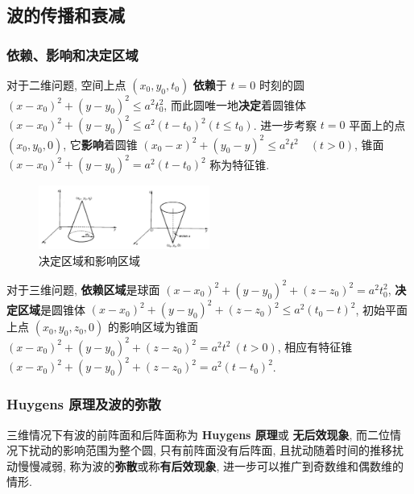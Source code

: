 \documentclass[10pt]{yerbaformat}
\begin{document}
\subsection{波的传播和衰减}

\subsubsection{依赖、影响和决定区域}
\par 对于二维问题, 空间上点 $\left(x_{0}, y_{0}, t_{0}\right)$ \textbf{依赖}于 $t=0$ 时刻的圆 $\left(x-x_{0}\right)^{2}+\left(y-y_{0}\right)^{2} \leqslant a^{2} t_{0}^{2}$, 而此圆唯一地\textbf{决定}着圆锥体 $\left(x-x_{0}\right)^{2}+\left(y-y_{0}\right)^{2} \leqslant a^{2}\left(t-t_{0}\right)^{2} \left(t \leqslant t_{0}\right)$. 进一步考察 $t=0$ 平面上的点 $\left(x_{0}, y_{0}, 0\right)$, 它\textbf{影响}着圆锥 $\left(x_{0}-x\right)^{2}+\left(y_{0}-y\right)^{2} \leqslant a^{2} t^{2} \quad(t>0)$, 锥面 $\left(x-x_{0}\right)^{2}+\left(y-y_{0}\right)^{2}=a^{2}\left(t-t_{0}\right)^{2}$ 称为特征锥.

\begin{figure}[htbp]
    \centering
    \includegraphics[width=0.5\textwidth]{figure/domain.jpg}
    \caption{决定区域和影响区域 \label{fig:scatter}}
\end{figure}

\par 对于三维问题, \textbf{依赖区域}是球面 $\left(x-x_{0}\right)^{2}+\left(y-y_{0}\right)^{2}+\left(z-z_{0}\right)^{2}=a^{2} t_{0}^{2}$, \textbf{决定区域}是圆锥体 $\left(x-x_{0}\right)^{2}+\left(y-y_{0}\right)^{2}+\left(z-z_{0}\right)^{2} \leqslant a^{2}\left(t_{0}-t\right)^{2}$, 初始平面上点 $\left(x_{0}, y_{0}, z_{0}, 0\right)$ 的影响区域为锥面 $\left(x-x_{0}\right)^{2}+\left(y-y_{0}\right)^{2}+\left(z-z_{0}\right)^{2}=a^{2} t^{2} \ (t>0)$, 相应有特征锥 $\left(x-x_{0}\right)^{2}+\left(y-y_{0}\right)^{2}+\left(z-z_{0}\right)^{2}=a^{2}\left(t-t_{0}\right)^{2}$.

\subsubsection{Huygens 原理及波的弥散}

\par 三维情况下有波的前阵面和后阵面称为 \textbf{Huygens 原理}或 \textbf{无后效现象}, 而二位情况下扰动的影响范围为整个圆, 只有前阵面没有后阵面, 且扰动随着时间的推移扰动慢慢减弱, 称为波的\textbf{弥散}或称\textbf{有后效现象}, 进一步可以推广到奇数维和偶数维的情形.
\end{document}
